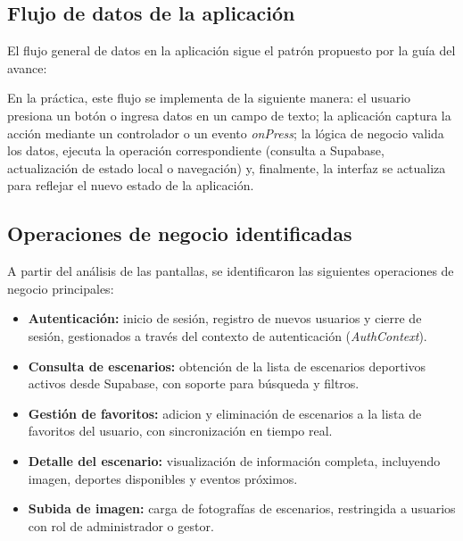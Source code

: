 \subsection{Flujo de datos de la aplicaci\'on}

El flujo general de datos en la aplicaci\'on sigue el patr\'on propuesto por la
gu\'ia del avance:

\begin{center}
\end{center}

En la pr\'actica, este flujo se implementa de la siguiente manera: el usuario
presiona un bot\'on o ingresa datos en un campo de texto; la aplicaci\'on captura
la acci\'on mediante un controlador o un evento \textit{onPress}; la l\'ogica de
negocio valida los datos, ejecuta la operaci\'on correspondiente (consulta a
Supabase, actualizaci\'on de estado local o navegaci\'on) y, finalmente, la interfaz
se actualiza para reflejar el nuevo estado de la aplicaci\'on.

\subsection{Operaciones de negocio identificadas}

A partir del an\'alisis de las pantallas, se identificaron las siguientes
operaciones de negocio principales:

\begin{itemize}
  \item \textbf{Autenticaci\'on:} inicio de sesi\'on, registro de nuevos usuarios
    y cierre de sesi\'on, gestionados a trav\'es del contexto de autenticaci\'on
    (\textit{AuthContext}).
  \item \textbf{Consulta de escenarios:} obtenci\'on de la lista de escenarios
    deportivos activos desde Supabase, con soporte para b\'usqueda y filtros.
  \item \textbf{Gesti\'on de favoritos:} adicion y eliminaci\'on de escenarios a la
    lista de favoritos del usuario, con sincronizaci\'on en tiempo real.
  \item \textbf{Detalle del escenario:} visualizaci\'on de informaci\'on completa,
    incluyendo imagen, deportes disponibles y eventos pr\'oximos.
  \item \textbf{Subida de imagen:} carga de fotograf\'ias de escenarios,
    restringida a usuarios con rol de administrador o gestor.
\end{itemize}
